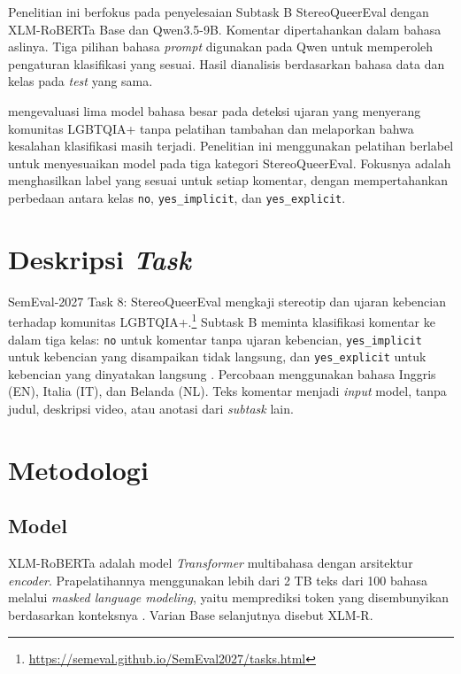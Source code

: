\documentclass[11pt]{article}
\begin{document}
Penelitian ini berfokus pada penyelesaian Subtask B StereoQueerEval dengan XLM-RoBERTa Base dan Qwen3.5-9B. Komentar dipertahankan dalam bahasa aslinya. Tiga pilihan bahasa \textit{prompt} digunakan pada Qwen untuk memperoleh pengaturan klasifikasi yang sesuai. Hasil dianalisis berdasarkan bahasa data dan kelas pada \textit{test} yang sama.

\citet{nguyen-etal-2025-leveraging} mengevaluasi lima model bahasa besar pada deteksi ujaran yang menyerang komunitas LGBTQIA+ tanpa pelatihan tambahan dan melaporkan bahwa kesalahan klasifikasi masih terjadi. Penelitian ini menggunakan pelatihan berlabel untuk menyesuaikan model pada tiga kategori StereoQueerEval. Fokusnya adalah menghasilkan label yang sesuai untuk setiap komentar, dengan mempertahankan perbedaan antara kelas \texttt{no}, \texttt{yes\_implicit}, dan \texttt{yes\_explicit}.

\section{Deskripsi \textit{Task}}
SemEval-2027 Task 8: StereoQueerEval mengkaji stereotip dan ujaran kebencian terhadap komunitas LGBTQIA+.\footnote{\url{https://semeval.github.io/SemEval2027/tasks.html}} Subtask B meminta klasifikasi komentar ke dalam tiga kelas: \texttt{no} untuk komentar tanpa ujaran kebencian, \nolinkurl{yes_implicit} untuk kebencian yang disampaikan tidak langsung, dan \nolinkurl{yes_explicit} untuk kebencian yang dinyatakan langsung \citep{stereoqueereval-2026-data}. Percobaan menggunakan bahasa Inggris (EN), Italia (IT), dan Belanda (NL). Teks komentar menjadi \textit{input} model, tanpa judul, deskripsi video, atau anotasi dari \textit{subtask} lain.

\section{Metodologi}
\subsection{Model}
XLM-RoBERTa adalah model \textit{Transformer} multibahasa dengan arsitektur \textit{encoder}. Prapelatihannya menggunakan lebih dari 2 TB teks dari 100 bahasa melalui \textit{masked language modeling}, yaitu memprediksi token yang disembunyikan berdasarkan konteksnya \citep{conneau-etal-2020-unsupervised}. Varian Base selanjutnya disebut XLM-R.
\end{document}
